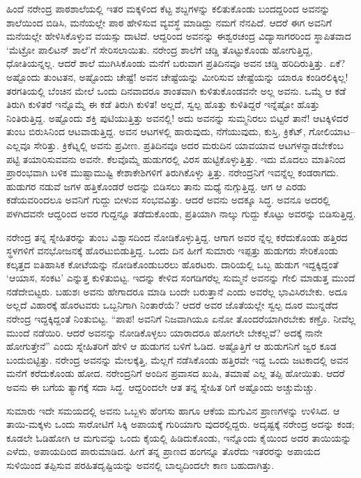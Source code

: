 ಹಿಂದೆ ನರೇಂದ್ರ ಪಾಠಶಾಲೆಯಲ್ಲಿ ಇತರ ಮಕ್ಕಳಿಂದ ಕೆಟ್ಟ ಶಬ್ದಗಳನ್ನು ಕಲಿತುಕೊಂಡು ಬಂದದ್ದರಿಂದ ಅವನನ್ನು ಶಾಲೆಯಿಂದ ಬಿಡಿಸಿ, ಮನೆಯಲ್ಲೇ ಪಾಠ ಹೇಳಿಸುವ ವ್ಯವಸ್ಥೆ ಮಾಡಿದ್ದು ನಮಗೆ ನೆನಪಿದೆ. ಆದರೆ ಈಗ ಅವನಿಗೆ ಮನೆಯಲ್ಲೇ ಹೇಳಿಸಿಕೊಳ್ಳುವ ವಯಸ್ಸು ದಾಟಿದೆ. ಆದ್ದರಿಂದ ಅವನನ್ನು ಈಶ್ವರಚಂದ್ರ ವಿದ್ಯಾಸಾಗರರಿಂದ ಸ್ಥಾಪಿತವಾದ ‘ಮೆಟ್ರೋ ಪಾಲಿಟನ್ ಶಾಲೆ’ಗೆ ಸೇರಿಸಲಾಯಿತು. ನರೇಂದ್ರ ಶಾಲೆಗೆ ಚಡ್ಡಿ ತೊಟ್ಟುಕೊಂಡು ಹೋಗುತ್ತಿದ್ದ, ಧೋತಿಯನ್ನಲ್ಲ. ಆದರೆ ಶಾಲೆ ಮುಗಿಸಿಕೊಂಡು ಮನೆಗೆ ಬರುವಾಗ ಪ್ರತಿದಿನವೂ ಅವನ ಚಡ್ಡಿ ಹರಿದಿರುತ್ತಿತ್ತು. ಏಕೆ? ಅಷ್ಟೊಂದು ತುಂಟತನ, ಅಷ್ಟೊಂದು ಚೇಷ್ಟೆ! ಅವನ ಚೇಷ್ಟೆಯನ್ನು ಮೀರಿಸುವ ಚೇಷ್ಟೆಯನ್ನು ಯಾರೂ ಕಂಡಿರಲಿಕ್ಕಿಲ್ಲ! ತರಗತಿಯಲ್ಲಿ ಬೆಂಚಿನ ಮೇಲೆ ಒಂದು ದಿನವಾದರೂ ಶಾಂತವಾಗಿ ಕುಳಿತುಕೊಂಡವನೇ ಅಲ್ಲ ಅವನು. ಒಮ್ಮೆ ಆ ಕಡೆ ತಿರುಗಿ ಕುಳಿತರೆ ಇನ್ನೊಮ್ಮೆ ಈ ಕಡೆ ತಿರುಗಿ ಕುಳಿತ! ಅಲ್ಲದೆ, ಸ್ವಲ್ಪ ಹೊತ್ತು ಕುಳಿತಿದ್ದರೆ ಇನ್ನೆಷ್ಟೋ ಹೊತ್ತು ನಿಂತಿರುತ್ತಿದ್ದ. ಅಷ್ಟೊಂದು ಶಕ್ತಿ ಪುಟಿಯುತ್ತಿತ್ತು ಅವನಲ್ಲಿ! ಅದು ಅವನನ್ನು ಸುಮ್ಮನಿರಲು ಬಿಟ್ಟರೆ ತಾನೆ! ಆಟಕ್ಕಿಳಿದರೆ ತುಂಬ ಬಿರುಸಿನಿಂದ ಆಟವಾಡುತ್ತಿದ್ದ. ಅವನ ಆಟಗಳಲ್ಲಿ ಹಾರುವುದು, ನೆಗೆಯುವುದು, ಕುಸ್ತಿ, ಕ್ರಿಕೆಟ್, ಗೋಲಿಯಾಟ–ಎಲ್ಲವೂ ಸೇರಿತ್ತು. ಕ್ರಿಕೆಟ್ನಲ್ಲಿ ಅವನು ಪ್ರವೀಣ. ಪ್ರತಿದಿನವೂ ಅದರ ಮರುದಿನ ಯಾವಯಾವ ಆಟಗಳನ್ನಾಡಬೇಕೆಂಬ ಪಟ್ಟಿ ತಯಾರಿಸುವವನು ಅವನೇ. ಕೆಲವೊಮ್ಮೆ ಹುಡುಗರಲ್ಲಿ ವಿರಸ ಹುಟ್ಟಿಕೊಳ್ಳುತ್ತಿತ್ತು. ಇದು ಮೊದಲು ಮಾತಿನಿಂದ ಪ್ರಾರಂಭವಾಗಿ ಬಳಿಕ ಮುಷ್ಟಾಮುಷ್ಟಿ ಕೇಶಾಕೇಶಿಗಳಿಗೆ ತಿರುಗಿಕೊಳ್ಳು ತ್ತಿತ್ತು. ನರೇಂದ್ರನಿಗೆ ಇವನ್ನೆಲ್ಲ ಕಂಡರಾಗದು. ಹುಡುಗರ ನಡುವೆ ಜಗಳ ಹತ್ತಿಕೊಂಡರೆ ಅದನ್ನು ಬಿಡಿಸಲು ತಾನು ಮಧ್ಯೆ ನುಗ್ಗುತ್ತಿದ್ದ. ಆಗ ಆ ಎರಡು ಕಡೆಯವರಿಂದಲೂ ಅವನಿಗೆ ಗುದ್ದು ಬೀಳುವ ಸಂಭವವಿತ್ತು. ಆದರೆ ಅವನು ಅದಕ್ಕೂ ಸಿದ್ಧ. ಅವನೂ ಅದರಲ್ಲಿ ಪಳಗಿದವನೇ ಆದ್ದರಿಂದ ಅವರ ಗುದ್ದನ್ನೂ ತಡೆದುಕೊಂಡು, ಪ್ರತಿಯಾಗಿ ನಾಲ್ಕು ಗುದ್ದು ಕೊಟ್ಟು ಅವರನ್ನು ಬಿಡಿಸುತ್ತಿದ್ದ.

ನರೇಂದ್ರ ತನ್ನ ಸ್ನೇಹಿತರನ್ನು ತುಂಬ ವಿಶ್ವಾಸದಿಂದ ನೋಡಿಕೊಳ್ಳುತ್ತಿದ್ದ. ಆಗಾಗ ಅವರ ನ್ನೆಲ್ಲ ಕರೆದುಕೊಂಡು ಹತ್ತಿರದ ಸ್ಥಳಗಳಿಗೆ ವನಭೋಜನಕ್ಕೆ ಹೊರಟುಬಿಡುತ್ತಿದ್ದ. ಒಂದು ದಿನ ಹೀಗೆ ಸುಮಾರು ಇಪ್ಪತ್ತು ಹುಡುಗರು ಸೇರಿಕೊಂಡು ಕಲ್ಕತ್ತದ ಐತಿಹಾಸಿಕ ಕೋಟೆಯನ್ನು ನೋಡಿಕೊಂಡುಬರಲು ಹೊರಟರು. ದಾರಿಯಲ್ಲಿ ಒಬ್ಬ ಹುಡುಗ ಇದ್ದಕ್ಕಿದ್ದಂತೆ ‘ಆಯಾಸ, ಸಂಕಟ’ ಎನ್ನುತ್ತ ಕುಳಿತುಬಿಟ್ಟ. ಇದನ್ನು ಕೇಳಿದ ಸಂಗಡಿಗರೆಲ್ಲ ಸುಮ್ಮನೆ ಅವನನ್ನು ಗೇಲಿ ಮಾಡುತ್ತ ಮುಂದೆ ನಡೆದೇಬಿಟ್ಟರು. ಬಹುಶಃ ಅವನು ಹೇಗಾದರೂ ಮಾಡಿ ಬಂದೇ ಬರುತ್ತಾನೆ ಎಂದು ಅವರೆಲ್ಲ ಭಾವಿಸಿರಬೇಕು. ಅದೂ ಅಲ್ಲದೆ ವಿಹಾರಕ್ಕೆ ಹೊರಟವರು ಒಬ್ಬನಿಗಾಗಿ ನಿಂತಾರೆಯೆ? ಆದರೆ ಅವರ ಜೊತೆಯಲ್ಲೇ ಸ್ವಲ್ಪ ದೂರ ಮುನ್ನಡೆದ ನರೇಂದ್ರ ಇದ್ದಕ್ಕಿದ್ದಂತೆ ನಿಂತುಬಿಟ್ಟ. “ಪಾಪ! ಅವನಿಗೆ ನಿಜವಾಗಿಯೂ ಏನೋ ತೊಂದರೆಯಾಗಿರಬೇಕು ಕಣ್ರೊ. ನೀವೆಲ್ಲ ಮುಂದೆ ನಡೆಯಿರಿ. ಆದರೆ ಅವನನ್ನು ನೋಡಿಕೊಳ್ಳಲು ಯಾರಾದರೂ ಹೋಗಲೇ ಬೇಕಲ್ಲವೆ? ಅದಕ್ಕೆ ನಾನೇ ಹೋಗುತ್ತೇನೆ” ಎಂದು ಸ್ನೇಹಿತರಿಗೆ ಹೇಳಿ ಆ ಹುಡುಗನ ಬಳಿಗೆ ಓಡಿದ. ಅಷ್ಟೊತ್ತಿಗೆ ಆ ಹುಡುಗನಿಗೆ ಜ್ವರ ಕೂಡ ಬಂದುಬಿಟ್ಟಿತ್ತು. ನರೇಂದ್ರ ಅವನನ್ನು ಮೇಲಕ್ಕೆತ್ತಿ, ಮೆಲ್ಲಗೆ ನಡೆಸಿಕೊಂಡು ಹತ್ತಿರವೇ ಇದ್ದ ಒಂದು ಜಟಕಾದಲ್ಲಿ ಅವನ ಮನೆಗೆ ಕರೆದುಕೊಂಡು ಹೋದ. ನರೇಂದ್ರನಿಗೆ ಅಂದಿನ ಪ್ರವಾಸದ ಖುಷಿ, ತಮಾಷೆ ಎಲ್ಲ ತಪ್ಪಿ ಹೋಯಿತು. ಆದರೆ ಅವನು ಈ ಬಗೆಯ ತ್ಯಾಗಕ್ಕೆ ಸದಾ ಸಿದ್ಧ. ಆದ್ದರಿಂದಲೇ ಆತ ತನ್ನ ಸ್ನೇಹಿತ ರಿಗೆ ಅಷ್ಟೊಂದು ಅಚ್ಚುಮೆಚ್ಚು.

ಸುಮಾರು ಇದೇ ಸಮಯದಲ್ಲಿ ಅವನು ಒಬ್ಬಳು ಹೆಂಗಸು ಹಾಗೂ ಆಕೆಯ ಮಗುವಿನ ಪ್ರಾಣಗಳನ್ನು ಉಳಿಸಿದ. ಆ ತಾಯಿ-ಮಕ್ಕಳು ಒಂದು ಸಾರೋಟಿಗೆ ಸಿಕ್ಕಿ ಅಪಾಯಕ್ಕೆ ಗುರಿಯಾಗು ವುದರಲ್ಲಿದ್ದರು. ಅದೃಷ್ಟಕ್ಕೆ ನರೇಂದ್ರ ಅದನ್ನು ಕಂಡ; ಕೂಡಲೇ ಓಡಿಹೋಗಿ ಆ ಮಗುವನ್ನು ಒಂದು ಕೈಯಲ್ಲಿ ಹಿಡಿದುಕೊಂಡು, ಇನ್ನೊಂದು ಕೈಯಿಂದ ಅದರ ತಾಯಿಯನ್ನು ಎಳೆದು, ಅಪಾಯದಿಂದ ಪಾರುಮಾಡಿದ. ಹೀಗೆ ತನ್ನ ಪ್ರಾಣದ ಹಂಗನ್ನೂ ತೊರೆದು ಇತರರನ್ನು ಅಪಾಯದ ಸುಳಿಯಿಂದ ತಪ್ಪಿಸುವ ಪರಹಿತದೃಷ್ಟಿಯನ್ನು ಅವನಲ್ಲಿ ಬಾಲ್ಯದಿಂದಲೇ ಕಾಣ ಬಹುದಾಗಿತ್ತು.

